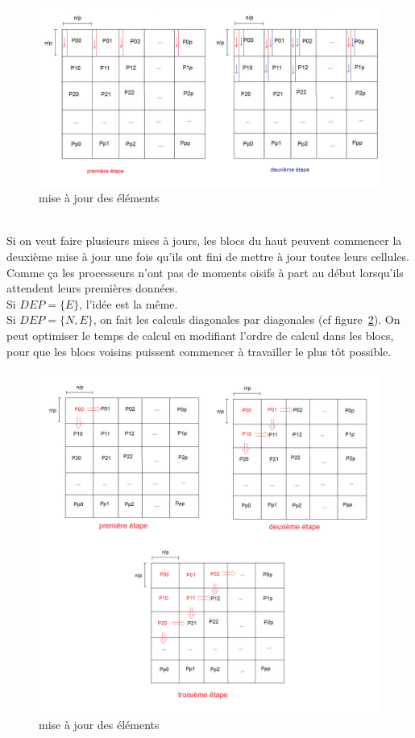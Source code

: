 \documentclass[a4paper,11pt]{article}
\begin{document}
\begin{figure}[!h]
\includegraphics[scale=0.4]{etapes.png}
\caption{mise à jour des éléments}
\label{etapes}
\end{figure}
\\
Si on veut faire plusieurs mises à jours, les blocs du haut peuvent commencer la deuxième mise à jour une fois qu'ils ont fini de mettre à jour toutes leurs cellules. Comme ça les processeurs n'ont pas de moments oisifs à part au début lorsqu'ils attendent leurs premières données.\\
Si $DEP = \{E\}$, l'idée est la même.\\
Si $DEP = \{N,E\}$, on fait les calculs diagonales par diagonales (cf figure~\ref{diagonales}).
On peut optimiser le temps de calcul en modifiant l'ordre de calcul dans les blocs, pour que les blocs voisins puissent commencer à travailler le plus tôt possible.
\begin{figure}[!h]
\includegraphics[scale=0.4]{diagonales.png}
\caption{mise à jour des éléments}
\label{diagonales}
\end{figure}
\end{document}
